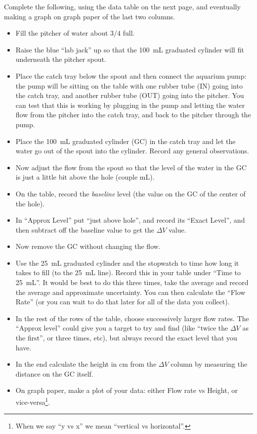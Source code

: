 \noindent Complete the following, using the data table on the next page, and eventually making a graph on graph paper of the last two columns.
	\begin{itemize}
	\item Fill the pitcher of water about $3/4$ full.
	\item Raise the blue ``lab jack'' up so that the 100~mL graduated cylinder will fit underneath the pitcher spout.
	\item Place the catch tray below the spout and then connect the aquarium pump: the pump will be sitting on the table with one rubber tube (IN) going into the catch tray, and another rubber tube (OUT) going into the pitcher.  You can test that this is working by plugging in the pump and letting the water flow from the pitcher into the catch tray, and back to the pitcher through the pump.
	\item Place the 100~mL graduated cylinder (GC) in the catch tray and let the water go out of the spout into the cylinder.  Record any general observations.
	\item Now adjust the flow from the spout so that the level of the water in the GC is just a little bit above the hole (couple mL).  
	\item On the table, record the {\em baseline} level (the value on the GC of the center of the hole).
	\item In ``Approx Level'' put ``just above hole'', and record its ``Exact Level'', and then subtract off the baseline value to get the $\Delta V$ value.
	\item Now remove the GC without changing the flow.
	\item Use the 25~mL graduated cylinder and the stopwatch to time how long it takes to fill (to the 25~mL line).  Record this in your table under ``Time to 25~mL''.  It would be best to do this three times, take the average and record the average and approximate uncertainty. You can then calculate the  ``Flow Rate'' (or you can wait to do that later for all of the data you collect).
	\item In the rest of the rows of the table, choose successively larger flow rates. The ``Approx level'' could give you a target to try and find (like ``twice the $\Delta V$ as the first'', or three times, etc), but always record the exact level that you have.
	\item In the end calculate the height in cm from the $\Delta V$ column by measuring the distance on the GC itself.  
	\item On graph paper, make a plot of your data: either Flow rate vs Height, or vice-versa\footnote{When we say ``y vs x'' we mean ``vertical vs horizontal''.}.
	\end{itemize}


